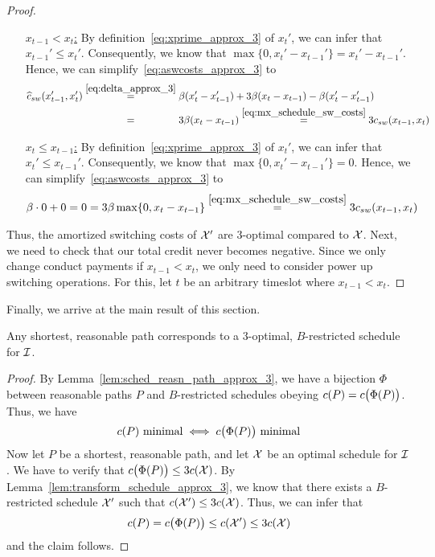 \begin{proof}
\begin{enumerate}[align=left]
	\item[\underline{$x_{t-1}<x_t$:}] By definition~\eqref{eq:xprime_approx_3} of $x_t'$, we can infer that $x_{t-1}'\le x_t'$. Consequently, we know that $\max\{0,x_t'-x_{t-1}'\}=x_t'-x_{t-1}'$. Hence, we can simplify~\eqref{eq:aswcosts_approx_3} to
		\begin{align*}
			\aswcosts(x_{t-1}',x_t')&\stackrel{\eqref{eq:delta_approx_3}}{=}\beta(x_t'-x_{t-1}')+3\beta(x_t-x_{t-1})-\beta(x_t'-x_{t-1}')\\
			&\stackrel{\phantom{\eqref{eq:delta_approx_3}}}{=}3\beta(x_t-x_{t-1})\stackrel{\eqref{eq:mx_schedule_sw_costs}}{=}3\swcosts(x_{t-1},x_t)
		\end{align*}
	\item[\underline{$x_t\le x_{t-1}$:}] By definition~\eqref{eq:xprime_approx_3} of $x_t'$, we can infer that $x_t'\le x_{t-1}'$. Consequently, we know that $\max\{0,x_t'-x_{t-1}'\}=0$. Hence, we can simplify~\eqref{eq:aswcosts_approx_3} to
		\begin{align*}
			\beta\cdot0+0=0=3\beta\max\{0,x_t-x_{t-1}\}\stackrel{\eqref{eq:mx_schedule_sw_costs}}{=}3c_{sw}(x_{t-1},x_t)
		\end{align*}
\end{enumerate}
Thus, the amortized switching costs of $\mathcal{X}'$ are 3-optimal compared to $\mathcal{X}$. Next, we need to check that our total credit never becomes negative. Since we only change conduct payments if $x_{t-1}<x_t$, we only need to consider power up switching operations. For this, let $t$ be an arbitrary timeslot where $x_{t-1}<x_t$.
\end{proof}
Finally, we arrive at the main result of this section.
\begin{thm}\label{thm:approx_3}
Any shortest, reasonable path corresponds to a 3-optimal, $B$-restricted schedule for $\mathcal{I}$.
\end{thm} 
\begin{proof}
By Lemma~\ref{lem:sched_reasn_path_approx_3}, we have a bijection $\Phi$ between reasonable paths $P$ and $B$-restricted schedules obeying $c(P)=c\bigl(\Phi(P)\bigr)$. Thus, we have 
\begin{equation*}
	c(P)\text{ minimal}\iff c\bigl(\Phi(P)\big)\text{ minimal}
\end{equation*}
Now let $P$ be a shortest, reasonable path, and let $\mathcal{X}$ be an optimal schedule for $\mathcal{I}$. We have to verify that $c\bigl(\Phi(P)\bigr)\le 3c(\mathcal{X})$. By Lemma~\ref{lem:transform_schedule_approx_3}, we know that there exists a $B$-restricted schedule $\mathcal{X}'$ such that $c(\mathcal{X}')\le 3c(\mathcal{X})$. Thus, we can infer that
\begin{equation*}
	c(P)=c\bigl(\Phi(P)\bigr)\le c(\mathcal{X}')\le 3c(\mathcal{X})
\end{equation*}
and the claim follows.
\end{proof}
